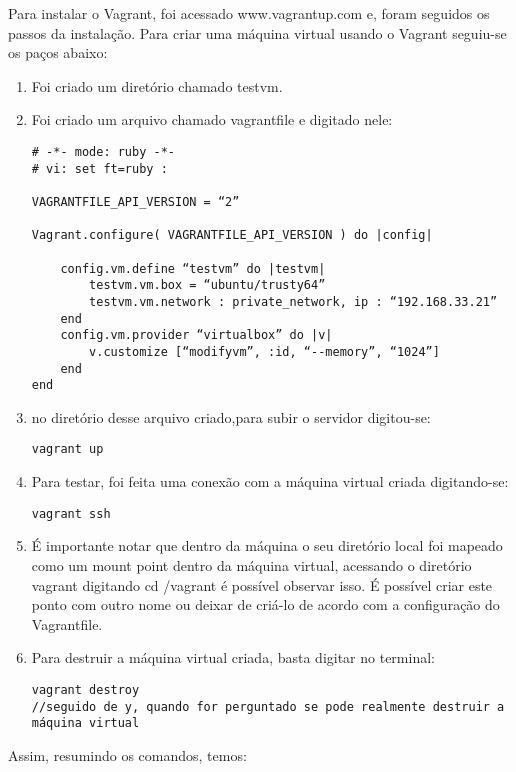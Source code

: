 Para instalar o Vagrant, foi acessado www.vagrantup.com e, 
foram seguidos os passos da instalação. Para criar uma 
máquina virtual usando o Vagrant seguiu-se os paços
abaixo:
\begin{enumerate}
   \item Foi criado um diretório chamado testvm. 
   \item Foi criado um arquivo chamado vagrantfile e 
   digitado nele:
      \begin{lstlisting}
# -*- mode: ruby -*-
# vi: set ft=ruby :

VAGRANTFILE_API_VERSION = “2”

Vagrant.configure( VAGRANTFILE_API_VERSION ) do |config|

	config.vm.define “testvm” do |testvm|
		testvm.vm.box = “ubuntu/trusty64”
		testvm.vm.network : private_network, ip : “192.168.33.21”
	end
	config.vm.provider “virtualbox” do |v|
		v.customize [“modifyvm”, :id, “--memory”, “1024”]
	end
end
      \end{lstlisting}
  \item no diretório desse arquivo criado,para subir o 
  servidor digitou-se:
    \begin{lstlisting}
vagrant up
    \end{lstlisting}

      \item Para testar, foi feita uma conexão com a 
      máquina virtual criada digitando-se:
    \begin{lstlisting}
vagrant ssh
    \end{lstlisting}
   \item É importante notar que dentro da máquina 
    o seu diretório local foi mapeado como um mount 
   point dentro da máquina virtual, acessando o 
   diretório vagrant digitando cd /vagrant é possível 
   observar isso. É possível criar este ponto com 
   outro nome ou deixar de criá-lo de acordo com a 
   configuração do Vagrantfile.
   \item Para destruir a máquina virtual criada, 
   basta digitar no terminal: 
    \begin{lstlisting}
vagrant destroy
//seguido de y, quando for perguntado se pode realmente destruir a máquina virtual
    \end{lstlisting}
\end{enumerate}
Assim, resumindo os comandos, temos:
